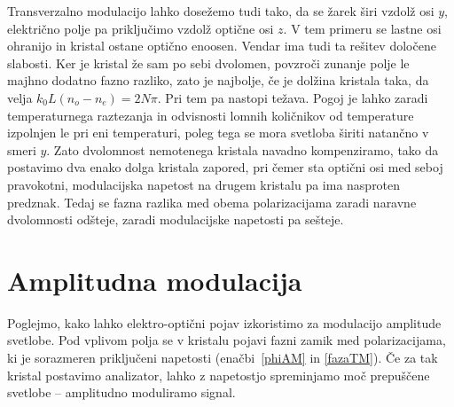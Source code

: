 \begin{remark}
Transverzalno modulacijo lahko dosežemo tudi tako, da se žarek širi vzdolž 
osi $y$, električno polje pa priključimo vzdolž optične osi $z$.
V tem primeru se lastne osi ohranijo in kristal ostane optično enoosen. Vendar 
 ima tudi ta rešitev določene slabosti. Ker je kristal že sam po sebi dvolomen, 
povzroči zunanje polje le majhno dodatno fazno razliko, zato je najbolje, če je dolžina 
kristala taka, da velja $k_{0}L(n_{o}-n_{e})=2N\pi$. Pri tem pa nastopi težava. 
Pogoj je lahko zaradi temperaturnega raztezanja in odvisnosti lomnih količnikov od temperature
izpolnjen le pri eni temperaturi, poleg tega se mora svetloba širiti natančno v smeri $y$.
Zato dvolomnost nemotenega kristala navadno kompenziramo, tako da postavimo 
dva enako dolga kristala zapored, pri čemer sta optični
osi med seboj pravokotni, modulacijska napetost na drugem kristalu pa ima
nasproten predznak. Tedaj se fazna razlika med obema polarizacijama zaradi 
naravne dvolomnosti odšteje, zaradi modulacijske napetosti pa sešteje.
\end{remark}

\section{Amplitudna modulacija}
\label{chap:ampmod}
Poglejmo, kako lahko elektro-optični pojav izkoristimo za modulacijo
amplitude svetlobe. Pod vplivom polja se v kristalu pojavi
fazni zamik med polarizacijama, ki je sorazmeren priključeni napetosti 
(enačbi~\ref{phiAM} in \ref{fazaTM}).
Če za tak kristal postavimo analizator, lahko z napetostjo spreminjamo 
moč prepuščene svetlobe -- amplitudno moduliramo signal.

